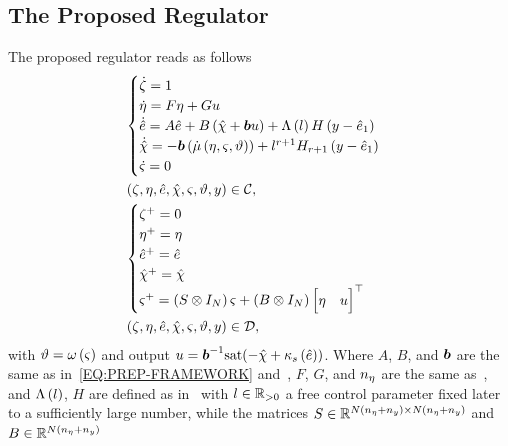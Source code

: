 \subsection{The Proposed Regulator}%
\label{SEC:PREP-PROPOSED-SOLUTION}
The proposed regulator reads as follows
\begin{equation}%
	\label{EQ:PREP-PROPOSED-REGULATOR}
	\begin{split}
		&
		\begin{cases}
			\dot{\clock} = 1 \\
			\dot{\im} = F \im + G u \\
			\dot{\hat{\ee}} = A \hat{\ee} + B \lp \hat{\chain} + \bs{\bfun} \uu \rp + \Lambda \lp l \rp H \lp \yy - \hat{\ee}_1 \rp \\
			\dot{\hat{\chain}} = - \bs{\bfun} \lp \dot{\pmu} \lp \im, \id, \param \rp \rp + l^{r+1} H_{r+1} \lp \yy - \hat{\ee}_1 \rp \\
			\dot{\id} = 0
		\end{cases} \\
		& \lp \clock, \im, \hat{\ee}, \hat{\chain}, \id, \param, \yy \rp \in \CC, \\
		&
		\begin{cases}
			\clock^{+} = 0 \\
			\im^{+} = \im \\
			\hat{\ee}^{+} = \hat{\ee} \\
			\hat{\chain}^{+} = \hat{\chain} \\
			\id^{+} = \lp S \otimes I_N \rp \id +  \lp B \otimes I_N \rp \begin{bmatrix} \im & \uu \end{bmatrix}\T
		\end{cases} \\
		& \lp \clock, \im, \hat{\ee}, \hat{\chain}, \id, \param, \yy \rp \in \DD,
	\end{split} 
\end{equation}
with $\vartheta = \omega \left( \varsigma \right)$ and output $u = \boldsymbol{b}^{-1}\text{sat}(-\hat{\chi} + \kappa_s \left( \hat{e} \right))$.
Where $A$, $B$, and $\boldsymbol{b}$ are the same as in~\eqref{EQ:PREP-FRAMEWORK} and~,
$F$, $G$, and $n_{\eta}$ are the same as~, and $\Lambda \left( l \right)$, $H$ are defined as
in~ with $l \in \mathbb{R}_{>0}$ a
free control parameter fixed later to a sufficiently large number, while the matrices
$S \in \mathbb{R}^{N(n_{\eta} + n_{y}) \times N(n_{\eta} + n_{y})}$ and $B \in \mathbb{R}^{N(n_{\eta} + n_{y})}$
